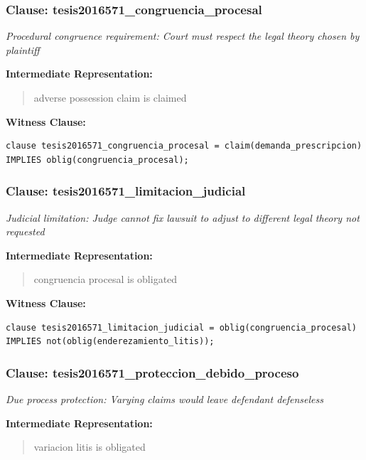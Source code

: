 \documentclass[11pt,a4paper]{article}
\begin{document}
\subsubsection{Clause: tesis2016571\_congruencia\_procesal}

\textit{Procedural congruence requirement: Court must respect the legal theory chosen by plaintiff}

\textbf{Intermediate Representation:}

\begin{quote}
adverse possession claim is claimed
\end{quote}

\textbf{Witness Clause:}

\begin{lstlisting}[style=witnessstyle, language=Witness]
clause tesis2016571_congruencia_procesal = claim(demanda_prescripcion) IMPLIES oblig(congruencia_procesal);
\end{lstlisting}

\subsubsection{Clause: tesis2016571\_limitacion\_judicial}

\textit{Judicial limitation: Judge cannot fix lawsuit to adjust to different legal theory not requested}

\textbf{Intermediate Representation:}

\begin{quote}
congruencia procesal is obligated
\end{quote}

\textbf{Witness Clause:}

\begin{lstlisting}[style=witnessstyle, language=Witness]
clause tesis2016571_limitacion_judicial = oblig(congruencia_procesal) IMPLIES not(oblig(enderezamiento_litis));
\end{lstlisting}

\subsubsection{Clause: tesis2016571\_proteccion\_debido\_proceso}

\textit{Due process protection: Varying claims would leave defendant defenseless}

\textbf{Intermediate Representation:}

\begin{quote}
variacion litis is obligated
\end{quote}
\end{document}
